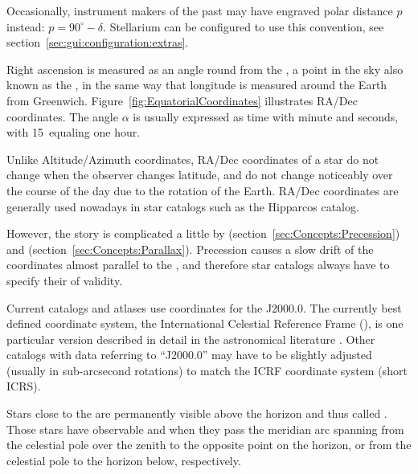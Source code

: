 Occasionally, instrument makers of the past may have engraved polar distance $p$ instead: $p=90^\circ-\delta$. 
Stellarium  can be configured to use this convention, see section~\ref{sec:gui:configuration:extras}.

Right ascension is measured as an angle round from the , a point in the sky
also known as the  \Aries, in the same way that
longitude is measured around the Earth from
Greenwich. Figure~\ref{fig:EquatorialCoordinates} illustrates RA/Dec
coordinates. The angle $\alpha$ is usually expressed as time with
minute and seconds, with 15\degree\ equaling one hour.

Unlike Altitude/Azimuth coordinates, RA/Dec coordinates of a star do
not change when the observer changes latitude, and do not change
noticeably over the course of the day due to the rotation of the
Earth.  RA/Dec coordinates are generally used nowadays in star
catalogs such as the Hipparcos catalog.

However, the story is complicated a little by 
(section~\ref{sec:Concepts:Precession}) and 
(section~\ref{sec:Concepts:Parallax}). Precession causes a slow drift
of the coordinates almost parallel to the ,
and therefore star catalogs always have to specify their  of
validity.

Current catalogs and atlases use coordinates for the
 J2000.0. The currently best defined
coordinate system, the International Celestial Reference Frame
(), is one particular version described in detail in
the astronomical literature \citep{ESAA:2013}. Other catalogs with data
referring to ``J2000.0'' may have to be slightly adjusted (usually in
sub-arcsecond rotations) to match the ICRF coordinate system (short ICRS).

Stars close to the  are
permanently visible above the horizon and thus called
.  Those stars have observable
 and  when they pass the meridian arc spanning
from the celestial pole over the zenith to the opposite point on the
horizon, or from the celestial pole to the horizon below,
respectively.


